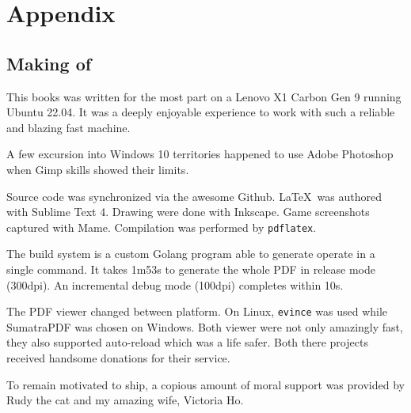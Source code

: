 \chapter{Appendix} 

\section{Making of}

This books was written for the most part on a Lenovo X1 Carbon Gen 9 running Ubuntu 22.04. It was a deeply enjoyable experience to work with such a reliable and blazing fast machine. 


A few excursion into Windows 10 territories happened to use Adobe Photoshop when Gimp skills showed their limits. 

Source code was synchronized via the awesome Github. \LaTeX\ was authored with Sublime Text 4. Drawing were done with Inkscape. Game screenshots captured with Mame. Compilation was performed by \texttt{pdflatex}.

The build system is a custom Golang program able to generate operate in a single  command. It takes 1m53s to generate the whole PDF in release mode (300dpi). An incremental debug mode (100dpi) completes within 10s. 

The PDF viewer changed between platform. On Linux, \texttt{evince} was used while SumatraPDF was chosen on Windows. Both viewer were not only amazingly fast, they also supported auto-reload which was a life safer. Both there projects received handsome donations for their service.

To remain motivated to ship, a copious amount of moral support was provided by Rudy the cat and my amazing wife, Victoria Ho.
